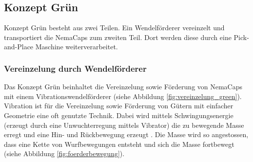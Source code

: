 \newpage
\subsection{Konzept Grün}
\label{KonzeptGreen}
Konzept Grün besteht aus zwei Teilen. Ein Wendelförderer vereinzelt und transportiert die NemaCaps zum zweiten Teil. Dort werden diese durch eine Pick-and-Place Maschine weiterverarbeitet.

\subsubsection{Vereinzelung durch Wendelförderer}

Das Konzept Grün beinhaltet die Vereinzelung sowie Förderung von NemaCaps mit einem Vibrationswendelförderer (siehe Abbildung \ref{fig:vereinzelung_green}).
Vibration ist für die Vereinzelung sowie Förderung von Gütern mit einfacher Geometrie eine oft genutzte Technik. Dabei wird mittels Schwingungsenergie (erzeugt durch eine Unwuchterregung mittels Vibrator) die zu bewegende Masse erregt und eine Hin- und Rückbewegung erzeugt \cite{risch}. Die Masse wird so angestossen, dass eine Kette von Wurfbewegungen entsteht und sich die Masse fortbewegt (siehe Abbildung \ref{fig:foerderbewegung}).


